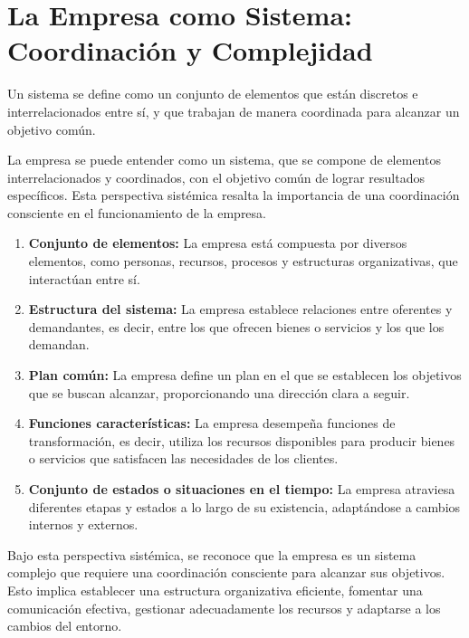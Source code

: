 \documentclass[
  a4paper,
]{article}
\begin{document}
\hypertarget{la-empresa-como-sistema-coordinaciuxf3n-y-complejidad}{%
\section{La Empresa como Sistema: Coordinación y
Complejidad}\label{la-empresa-como-sistema-coordinaciuxf3n-y-complejidad}}

Un sistema se define como un conjunto de elementos que están discretos e
interrelacionados entre sí, y que trabajan de manera coordinada para
alcanzar un objetivo común.

La empresa se puede entender como un sistema, que se compone de
elementos interrelacionados y coordinados, con el objetivo común de
lograr resultados específicos. Esta perspectiva sistémica resalta la
importancia de una coordinación consciente en el funcionamiento de la
empresa.

\begin{enumerate}
\def\labelenumi{\arabic{enumi}.}
\item
  \textbf{Conjunto de elementos:} La empresa está compuesta por diversos
  elementos, como personas, recursos, procesos y estructuras
  organizativas, que interactúan entre sí.
\item
  \textbf{Estructura del sistema:} La empresa establece relaciones entre
  oferentes y demandantes, es decir, entre los que ofrecen bienes o
  servicios y los que los demandan.
\item
  \textbf{Plan común:} La empresa define un plan en el que se establecen
  los objetivos que se buscan alcanzar, proporcionando una dirección
  clara a seguir.
\item
  \textbf{Funciones características:} La empresa desempeña funciones de
  transformación, es decir, utiliza los recursos disponibles para
  producir bienes o servicios que satisfacen las necesidades de los
  clientes.
\item
  \textbf{Conjunto de estados o situaciones en el tiempo:} La empresa
  atraviesa diferentes etapas y estados a lo largo de su existencia,
  adaptándose a cambios internos y externos.
\end{enumerate}

Bajo esta perspectiva sistémica, se reconoce que la empresa es un
sistema complejo que requiere una coordinación consciente para alcanzar
sus objetivos. Esto implica establecer una estructura organizativa
eficiente, fomentar una comunicación efectiva, gestionar adecuadamente
los recursos y adaptarse a los cambios del entorno.
\end{document}
